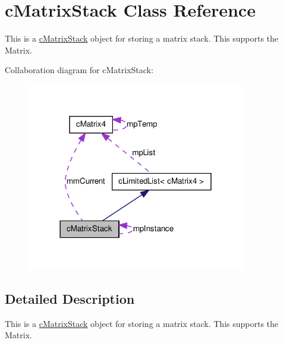 \hypertarget{classc_matrix_stack}{
\section{cMatrixStack Class Reference}
\label{classc_matrix_stack}
}


This is a \hyperlink{classc_matrix_stack}{cMatrixStack} object for storing a matrix stack. This supports the Matrix.  




Collaboration diagram for cMatrixStack:\nopagebreak
\begin{figure}[H]
\begin{center}
\leavevmode
\includegraphics[width=270pt]{classc_matrix_stack__coll__graph}
\end{center}
\end{figure}


\subsection{Detailed Description}
This is a \hyperlink{classc_matrix_stack}{cMatrixStack} object for storing a matrix stack. This supports the Matrix. 